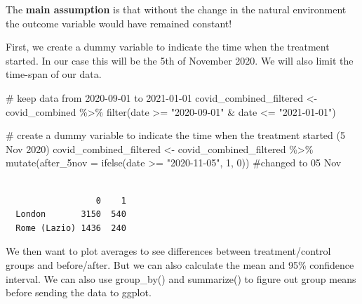 \documentclass[
  letterpaper,
  DIV=11,
  numbers=noendperiod]{scrreprt}
\newenvironment{Shaded}{\begin{snugshade}}{\end{snugshade}}
\newcommand{\AttributeTok}[1]{\textcolor[rgb]{0.40,0.45,0.13}{#1}}
\newcommand{\CommentTok}[1]{\textcolor[rgb]{0.37,0.37,0.37}{#1}}
\newcommand{\DecValTok}[1]{\textcolor[rgb]{0.68,0.00,0.00}{#1}}
\newcommand{\FunctionTok}[1]{\textcolor[rgb]{0.28,0.35,0.67}{#1}}
\newcommand{\NormalTok}[1]{\textcolor[rgb]{0.00,0.23,0.31}{#1}}
\newcommand{\OtherTok}[1]{\textcolor[rgb]{0.00,0.23,0.31}{#1}}
\newcommand{\SpecialCharTok}[1]{\textcolor[rgb]{0.37,0.37,0.37}{#1}}
\newcommand{\StringTok}[1]{\textcolor[rgb]{0.13,0.47,0.30}{#1}}
\begin{document}
The \textbf{main assumption} is that without the change in the natural
environment the outcome variable would have remained constant!

First, we create a dummy variable to indicate the time when the
treatment started. In our case this will be the 5th of November 2020. We
will also limit the time-span of our data.

\begin{Shaded}
\begin{Highlighting}[]
\CommentTok{\# keep data from 2020{-}09{-}01 to 2021{-}01{-}01}
\NormalTok{covid\_combined\_filtered }\OtherTok{\textless{}{-}}\NormalTok{ covid\_combined }\SpecialCharTok{\%\textgreater{}\%}
  \FunctionTok{filter}\NormalTok{(date }\SpecialCharTok{\textgreater{}=} \StringTok{"2020{-}09{-}01"} \SpecialCharTok{\&}\NormalTok{ date }\SpecialCharTok{\textless{}=} \StringTok{"2021{-}01{-}01"}\NormalTok{)}

\CommentTok{\# create a dummy variable to indicate the time when the treatment started (5 Nov 2020)}
\NormalTok{covid\_combined\_filtered }\OtherTok{\textless{}{-}}\NormalTok{ covid\_combined\_filtered }\SpecialCharTok{\%\textgreater{}\%}
  \FunctionTok{mutate}\NormalTok{(}\AttributeTok{after\_5nov =} \FunctionTok{ifelse}\NormalTok{(date }\SpecialCharTok{\textgreater{}=} \StringTok{"2020{-}11{-}05"}\NormalTok{, }\DecValTok{1}\NormalTok{, }\DecValTok{0}\NormalTok{)) }\CommentTok{\#changed to 05 Nov}
\end{Highlighting}
\end{Shaded}

\begin{Shaded}
\end{Shaded}

\begin{verbatim}
              
                  0    1
  London       3150  540
  Rome (Lazio) 1436  240
\end{verbatim}

We then want to plot averages to see differences between
treatment/control groups and before/after. But we can also calculate the
mean and 95\% confidence interval. We can also use group\_by() and
summarize() to figure out group means before sending the data to ggplot.
\end{document}
